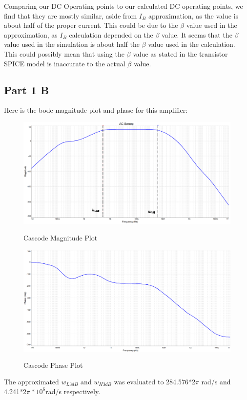 \documentclass[12pt]{article}
\begin{document}
Comparing our DC Operating points to our calculated DC operating points, we find that they are mostly similar, aside from $I_B$ approximation, as the value is about half of the proper current. This could be due to the $\beta$ value used in the approximation, as $I_B$ calculation depended on the $\beta$ value. It seems that the $\beta$ value used in the simulation is about half the $\beta$ value used in the calculation. This could possibly mean that using the $\beta$ value as stated in the transistor SPICE model is inaccurate to the actual $\beta$ value.

\subsection{Part 1 B}
Here is the bode magnitude plot and phase for this amplifier:

\begin{figure}[h!]
\centering
\includegraphics[height=0.35\textwidth]{Images/Part_1_magnitude.png}\\
\caption{Cascode Magnitude Plot}
\label{fig:part1_circuit_sim}
\end{figure}

\begin{figure}[h!]
\centering
\includegraphics[height=0.35\textwidth]{Images/Part_1_phase.png}\\
\caption{Cascode Phase Plot}
\label{fig:part1_circuit_sim}
\end{figure}

The approximated $w_{L3dB}$ and $w_{H3dB}$ was evaluated to 284.576*2$\pi$ rad/s and 4.241*2$\pi*10^6$rad/s respectively.
\end{document}
